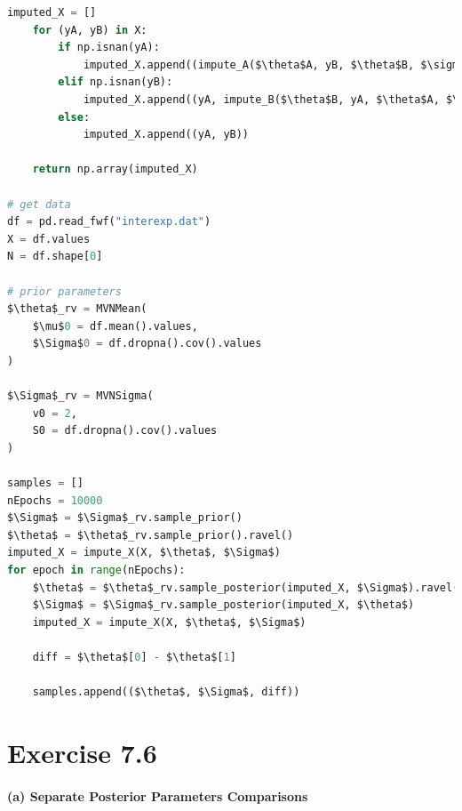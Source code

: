 \documentclass[11pt, letterpaper]{article}
\begin{document}
\begin{lstlisting}[language=Python]
    imputed_X = []
    for (yA, yB) in X:
        if np.isnan(yA):
            imputed_X.append((impute_A($\theta$A, yB, $\theta$B, $\sigma$2A, $\sigma$2B, $\rho$), yB))
        elif np.isnan(yB):
            imputed_X.append((yA, impute_B($\theta$B, yA, $\theta$A, $\sigma$2B, $\sigma$2A, $\rho$)))
        else:
            imputed_X.append((yA, yB))

    return np.array(imputed_X)

# get data
df = pd.read_fwf("interexp.dat")
X = df.values
N = df.shape[0]

# prior parameters
$\theta$_rv = MVNMean(
    $\mu$0 = df.mean().values,
    $\Sigma$0 = df.dropna().cov().values
)

$\Sigma$_rv = MVNSigma(
    v0 = 2,
    S0 = df.dropna().cov().values
)

samples = []
nEpochs = 10000
$\Sigma$ = $\Sigma$_rv.sample_prior()
$\theta$ = $\theta$_rv.sample_prior().ravel()
imputed_X = impute_X(X, $\theta$, $\Sigma$)
for epoch in range(nEpochs):
    $\theta$ = $\theta$_rv.sample_posterior(imputed_X, $\Sigma$).ravel()
    $\Sigma$ = $\Sigma$_rv.sample_posterior(imputed_X, $\theta$)
    imputed_X = impute_X(X, $\theta$, $\Sigma$)

    diff = $\theta$[0] - $\theta$[1]

    samples.append(($\theta$, $\Sigma$, diff))
\end{lstlisting}



\newpage
\section{Exercise 7.6}
\paragraph{(a) Separate Posterior Parameters Comparisons}
\end{document}
